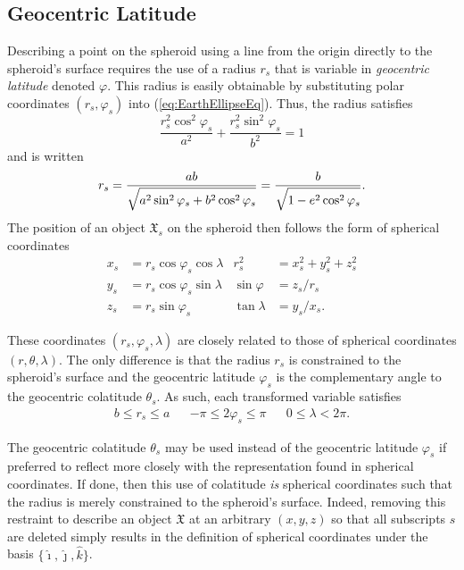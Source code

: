\documentclass[11pt,dvipsnames]{thesis}
\begin{document}
\subsection{Geocentric Latitude}
Describing a point on the spheroid using a line from the origin directly to the spheroid's surface requires the use of a radius $r_s$ that is variable in \textit{geocentric latitude} denoted $\varphi$. This radius is easily obtainable by substituting polar coordinates $(r_s, \varphi_s)$ into (\ref{eq:EarthEllipseEq}). Thus, the radius satisfies
\begin{equation}
\frac{r_s^2\cos^2\varphi_s}{a^2} + \frac{r_s^2\sin^2\varphi_s}{b^2} = 1 \label{eq:spheroidPolar}
\end{equation}
and is written
\begin{equation}
r_s = \frac{ab}{\sqrt{\vphantom{\cosphantom^2} a^2\,\smash{\sin}^2\,\varphi_s + b^2\cos^2\varphi_s}} = \frac{b}{\sqrt{\vphantom{\cosphantom^2} 1-e^2\cos^2\varphi_s}}. \label{eq:geocentricRadius}
\end{equation}
The position of an object $\mathfrak{X}_s$ on the spheroid then follows the form of spherical coordinates
\begin{align}
x_s &= r_s \cos\varphi_s \cos\lambda & r_s^2 &= x_s^2 + y_s^2 + z_s^2 \\
y_s &= r_s \cos\varphi_s \sin\lambda & \sin\varphi &= z_s / r_s \\
z_s &= r_s \sin\varphi_s & \tan\lambda &= y_s / x_s.
\end{align}

These coordinates $(r_s, \varphi_s, \lambda)$ are closely related to those of spherical coordinates $(r, \theta, \lambda)$. The only difference is that the radius $r_{\!s}$ is constrained to the spheroid's surface and the geocentric latitude $\varphi_s$ is the complementary angle to the geocentric colatitude $\theta_s$. As such, each transformed variable satisfies
\begin{align}
b \leqslant r_s \leqslant a && -\pi \leqslant 2\varphi_s \leqslant \pi && 0 \leqslant \lambda < 2\pi.
\end{align}


The geocentric colatitude $\theta_s$ may be used instead of the geocentric latitude $\varphi_s$ if preferred to reflect more closely with the representation found in spherical coordinates. If done, then this use of colatitude \textit{is} spherical coordinates such that the radius is merely constrained to the spheroid's surface. Indeed, removing this restraint to describe an object $\mathfrak{X}$ at an arbitrary $(x, y, z)$ so that all subscripts $s$ are deleted simply results in the definition of spherical coordinates under the basis $\{\hat{\imath}, \hat{\jmath}, \hat{k}\}$.
\end{document}
